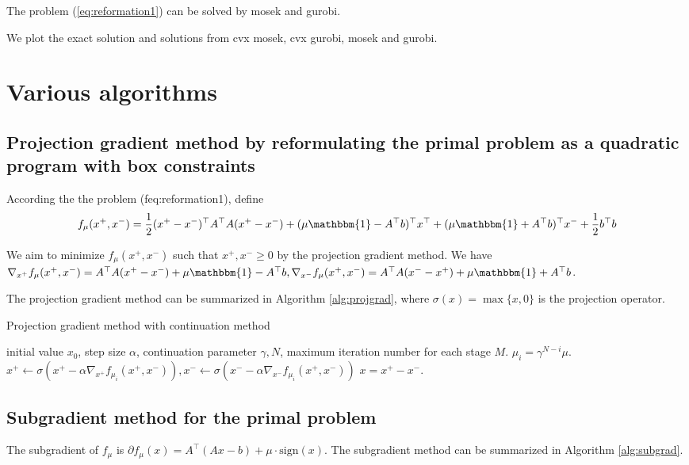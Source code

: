 \documentclass{article}
\numberwithin{equation}{section}
\numberwithin{figure}{section}
\begin{document}
The problem (\ref{eq:reformation1}) can be solved by mosek and gurobi.

We plot the exact solution
and solutions from cvx mosek, cvx gurobi, mosek and gurobi.



\section{Various algorithms}
\subsection{Projection gradient method by reformulating the primal problem as a quadratic program with box constraints}
According the the problem (\re  f{eq:reformation1}), define
\begin{equation}
    f_\mu(x^+,x^-) = \frac{1}{2}(x^+-x^-)^\top A^\top A(x^+-x^-) + (\mu\mathbbm{1}-A^\top b)^\top x^\top +(\mu\mathbbm{1}+A^\top b)^\top x^-+\frac{1}{2}b^\top b
\end{equation}

We aim to minimize $f_\mu(x^+,x^-)$ such that $x^+,x^-\geq 0$ by the projection gradient method. We have $\nabla_{x^+} f_\mu(x^+,x^-)=A^\top A(x^+-x^-)+\mu \mathbbm{1}-A^\top b, \nabla_{x^-} f_\mu(x^+,x^-)=A^\top A(x^--x^+)+\mu \mathbbm{1}+A^\top b$. 

The projection gradient method can be summarized in Algorithm \ref{alg:projgrad}, where $\sigma(x)=\max\{x,0\}$ is the projection operator.




    \begin{algorithm}[!htbp]\caption{Projection gradient method with continuation method}\label{alg:projgrad}
        \begin{algorithmic}[1]
         initial value $x_0$, step size $\alpha$, continuation parameter $\gamma,N$, maximum iteration number for each stage $M$.
        \STATE $\mu_i = \gamma^{N-i}\mu$.
        \STATE $x^+\leftarrow \sigma(x^+ -\alpha \nabla_{x^+} f_{\mu_i}(x^+,x^-)), x^-\leftarrow \sigma(x^- -\alpha \nabla_{x^-} f_{\mu_i}(x^+,x^-)) $
        \ENDFOR
        \ENDFOR
         $x=x^+-x^-$.
        \end{algorithmic}
        \end{algorithm}


\subsection{Subgradient method for the primal problem}
The subgradient of $f_\mu$ is $\partial f_\mu(x) = A^\top(Ax-b)+\mu\cdot \mathrm{sign}(x)$. The subgradient method can be summarized in Algorithm \ref{alg:subgrad}.
\end{document}
